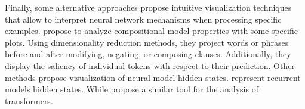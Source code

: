 Finally, some alternative approaches propose intuitive visualization techniques that allow to interpret neural network mechanisms when processing specific examples. \textcite{li_16} propose to analyze compositional model properties with some specific plots. Using dimensionality reduction methods, they project words or phrases before and after modifying, negating, or composing clauses. Additionally, they display the saliency of individual tokens with respect to their prediction. Other methods propose visualization of neural model hidden states. \textcite{strobelt_18} represent recurrent models hidden states. While \textcite{hoover_19} propose a similar tool for the analysis of transformers.
